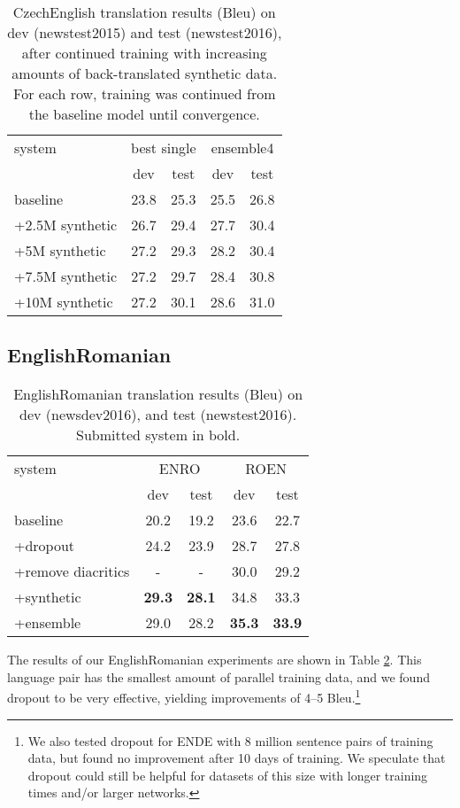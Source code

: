 \documentclass[11pt]{article}
\begin{document}
\begin{table}
\centering
\begin{tabular}{l|cc|cc}
system & \multicolumn{2}{c|}{best single} & \multicolumn{2}{c}{ensemble4}\\
& dev & test & dev & test\\
\hline
baseline & 23.8 & 25.3 &   25.5 & 26.8 \\  +2.5M synthetic & 26.7 & 29.4 &  27.7 & 30.4 \\ +5M synthetic & 27.2 & 29.3 &  28.2 & 30.4 \\ +7.5M synthetic & 27.2 & 29.7 &  28.4  & 30.8 \\ +10M synthetic & 27.2 & 30.1 &  28.6 & 31.0 \\ \end{tabular}
\caption{CzechEnglish translation results ({\sc Bleu}) on dev (newstest2015) and test (newstest2016), after continued training with increasing amounts of 
back-translated synthetic data. For each row, training was continued from the baseline model until convergence.}
\label{increase-bt}
\end{table}

\subsection{EnglishRomanian}

\begin{table}[t]
\centering
\begin{tabular}{l|cc|cc}
system & \multicolumn{2}{c|}{ENRO} & \multicolumn{2}{c}{ROEN}\\
& dev & test & dev & test\\
\hline
baseline & 20.2 & 19.2 &23.6 & 22.7\\ +dropout & 24.2 & 23.9 & 28.7 & 27.8\\ +remove diacritics & - & - & 30.0 & 29.2\\ +synthetic & \textbf{29.3} & \textbf{28.1} & 34.8 & 33.3\\ +ensemble & 29.0 & 28.2 & \textbf{35.3} & \textbf{33.9}\\ \end{tabular}
\caption{EnglishRomanian translation results ({\sc Bleu}) on dev (newsdev2016), and test (newstest2016). Submitted system in bold.}
\label{results-ro}
\end{table}

The results of our EnglishRomanian experiments are shown in Table \ref{results-ro}.
This language pair has the smallest amount of parallel training data, and we found dropout to be very effective, yielding improvements of 4--5 {\sc Bleu}.\footnote{We also tested dropout for ENDE with 8 million sentence pairs of training data, but found no improvement after 10 days of training. We speculate that dropout could still be helpful for datasets of this size with longer training times and/or larger networks.}
\end{document}
